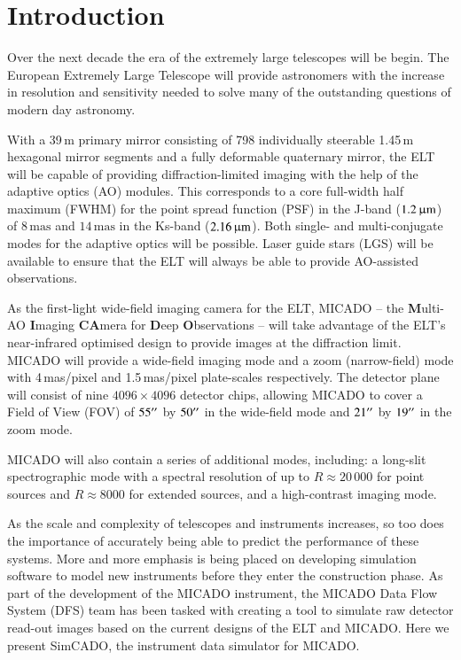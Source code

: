 \section{Introduction}
\label{sec:Introduction}

Over the next decade the era of the extremely large telescopes will be begin. The European Extremely Large Telescope \citep[ELT, ][]{eelt} will provide astronomers with the increase in resolution and sensitivity needed to solve many of the outstanding questions of modern day astronomy. 

With a 39\,m primary mirror consisting of 798 individually steerable 1.45\,m hexagonal mirror segments and a fully deformable quaternary mirror, the ELT will be capable of providing diffraction-limited imaging with the help of the adaptive optics (AO) modules. This corresponds to a core full-width half maximum (FWHM) for the point spread function (PSF) in the J-band ($1.2\,\upmu\mathrm{m}$) of $8\,\mathrm{mas}$ and $14\,\mathrm{mas}$ in the Ks-band ($2.16\,\upmu\mathrm{m}$). Both single- and multi-conjugate modes for the adaptive optics will be possible. Laser guide stars (LGS) will be available to ensure that the ELT will always be able to provide AO-assisted observations. 

As the first-light wide-field imaging camera for the ELT, MICADO -- the \textbf{M}ulti-AO \textbf{I}maging \textbf{CA}mera for \textbf{D}eep \textbf{O}bservations \citep{micado} -- will take advantage of the ELT's near-infrared optimised design to provide images at the diffraction limit. MICADO will provide a wide-field imaging mode and a zoom (narrow-field) mode with 4\,mas/pixel and 1.5\,mas/pixel plate-scales respectively. The detector plane will consist of nine $4096\times 4096$ detector chips, allowing MICADO to cover a Field of View (FOV) of $55^{\prime\prime}$ by $50^{\prime\prime}$ in the wide-field mode and $21^{\prime\prime}$ by $19^{\prime\prime}$ in the zoom mode.

MICADO will also contain a series of additional modes, including: a long-slit spectrographic mode with a spectral resolution of up to $R\approx 20\,000$ for point sources and $R\approx 8000$ for extended sources, and a high-contrast imaging mode.

As the scale and complexity of telescopes and instruments increases, so too does the importance of accurately being able to predict the performance of these systems. More and more emphasis is being placed on developing simulation software to model new instruments before they enter the construction phase. As part of the development of the MICADO instrument, the MICADO Data Flow System (DFS) team has been tasked with creating a tool to simulate raw detector read-out images based on the current designs of the ELT and MICADO. Here we present SimCADO, the instrument data simulator for MICADO. 

